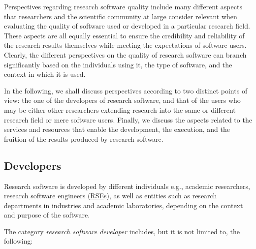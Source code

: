 
Perspectives regarding research software quality include many different aspects that researchers and the scientific community at large consider relevant when evaluating the quality of software used or developed in a particular research field. These aspects are all equally essential to ensure the credibility and reliability of the research results themselves while meeting the expectations of software users. Clearly, the different perspectives on the quality of research software can branch significantly based on the individuals using it, the type of software, and the context in which it is used.

In the following, we shall discuss perspectives according to two distinct points of view: the one of the developers of research software, and that of the users who may be either other researchers extending research into the same or different research field or mere software users. Finally, we discuss the aspects related to the services and resources that enable the development, the execution, and the fruition of the results produced by research software.

\subsection{Developers}


Research software is developed by different individuals e.g., academic researchers, research software engineers (\href{https://society-rse.org/}{RSE}s), as well as entities such as research departments in industries and academic laboratories, depending on the context and purpose of the software.

The category \textit{research software developer} includes, but it is not limited to, the following:

